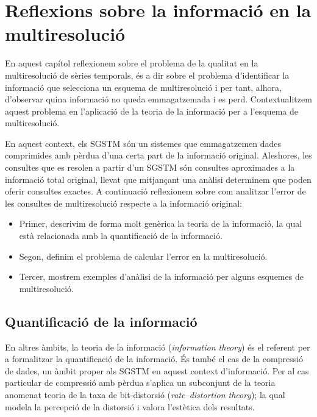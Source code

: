 \chapter{Reflexions sobre la informació en la multiresolució}
\label{sec:multiresolucio:teoriainformacio}


En aquest capítol reflexionem sobre el problema de la qualitat en la
multiresolució de sèries temporals, és a dir sobre el problema
d'identificar la informació que selecciona un esquema de
multiresolució i per tant, alhora, d'observar quina informació no
queda emmagatzemada i es perd.  Contextualitzem aquest problema en
l'aplicació de la teoria de la informació per a l'esquema de
multiresolució.

En aquest context, els \gls{SGSTM} són un sistemes que emmagatzemen
dades comprimides amb pèrdua d'una certa part de la informació
original. Aleshores, les consultes que es resolen a partir d'un
\gls{SGSTM} són consultes aproximades a la informació total original,
llevat que mitjançant una anàlisi determinem que poden oferir
consultes exactes. A continuació reflexionem sobre com analitzar
l'error de les consultes de multiresolució respecte a la informació
original:
\begin{itemize}
\item Primer, descrivim de forma molt genèrica la teoria de la
  informació, la qual està relacionada amb la quantificació de la
  informació.
\item Segon, definim el problema de calcular l'error en la multiresolució.
\item Tercer, mostrem exemples d'anàlisi de la informació per alguns
  esquemes de multiresolució.
\end{itemize}





\section{Quantificació de la informació}

En altres àmbits, la teoria de la informació (\emph{information
  theory}) és el referent per a formalitzar la quantificació de la
informació. És també el cas de la compressió de dades, un àmbit proper
als \gls{SGSTM} en aquest context d'informació.  Per al cas particular
de compressió amb pèrdua s'aplica un subconjunt de la teoria anomenat
teoria de la taxa de
bit-distorsió %
(\emph{rate–distortion theory}); la qual modela la percepció de la
distorsió i valora l'estètica dels resultats.


